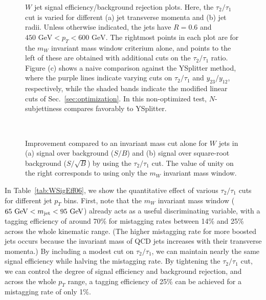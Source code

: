 \documentclass{JHEP3}
\newcommand{\vsh}{\vspace{-.5cm}}
\newcommand{\GeV}{\text{GeV}}
\DeclareRobustCommand{\Sec}[1]{Sec.~\ref{#1}}
\DeclareRobustCommand{\Tab}[1]{Table~\ref{#1}}
\begin{document}
\begin{figure}[tp]
  \begin{center}
  \end{center}
  \vsh
  \caption{$W$ jet signal efficiency/background rejection plots.  Here, the $\tau_2/\tau_1$ cut is varied for different (a) jet transverse momenta and (b) jet radii.  Unless otherwise indicated, the jets have $R= 0.6$ and $450 \text{ GeV} < p_T < 600 \text{ GeV}$.  The rightmost points in each plot are for the $m_W$ invariant mass window criterium alone, and points to the left of these are obtained with additional cuts on the $\tau_2/\tau_1$ ratio. Figure (c) shows a naive comparison against the YSplitter method, where the purple lines indicate varying cuts on $\tau_2/\tau_1$ and $y_{23}/y_{12}$, respectively, while the shaded bands indicate the modified linear cuts of \Sec{sec:optimization}.  In this non-optimized test, $N$-subjettiness compares favorably to YSplitter.}
  \label{fig:WSigEff}
\end{figure}

\begin{figure}[tp]
  \begin{center}
      \\
  \end{center}
  \vsh
  \caption{Improvement compared to an invariant mass cut alone for $W$ jets in (a) signal over background ($S/B$) and (b) signal over square-root background ($S/\sqrt{B}$) by using the $\tau_2/\tau_1$ cut. The value of unity on the right corresponds to using only the $m_W$ invariant mass window.}
  \label{fig:WSigImprov}
\end{figure}

In \Tab{tab:WSigEff06}, we show the quantitative effect of various $\tau_2/\tau_1$ cuts for different jet $p_T$ bins.  First, note that the $m_W$ invariant mass window ($65~\GeV < m_{\rm jet} < 95~\GeV$) already acts as a useful discriminating variable, with a tagging efficiency of around 70\% for  mistagging rates between 14\% and 25\% across the whole kinematic range.  (The higher mistagging rate for more boosted jets occurs because the invariant mass of QCD jets increases with their transverse momenta.)  By including a modest cut on $\tau_2/\tau_1$, we can maintain nearly the same signal efficiency while halving the mistagging rate.  By tightening the $\tau_2/\tau_1$ cut, we can control the degree of signal efficiency and background rejection, and across the whole $p_T$ range, a tagging efficiency of 25\% can be achieved for a mistagging rate of only 1\%.
\end{document}
